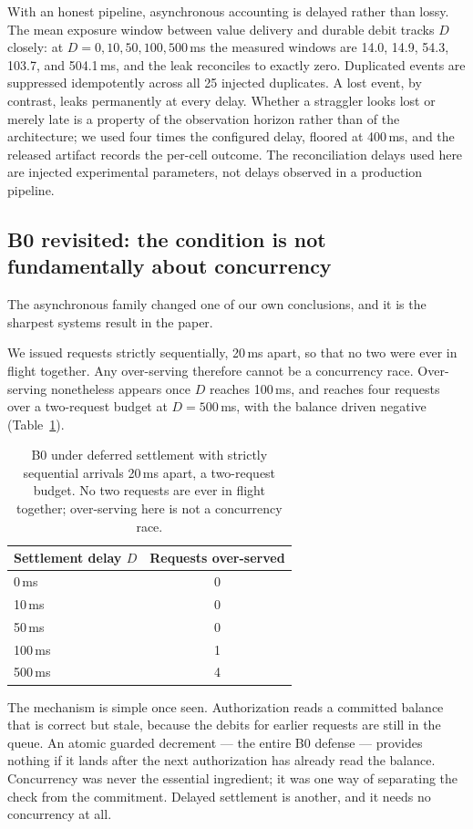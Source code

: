 \documentclass[preprint,3p,authoryear,12pt]{elsarticle}
\begin{document}
With an honest pipeline, asynchronous accounting is delayed rather than lossy. The mean
exposure window between value delivery and durable debit tracks $D$ closely: at $D = 0,
10, 50, 100, 500$\,ms the measured windows are 14.0, 14.9, 54.3, 103.7, and 504.1\,ms, and
the leak reconciles to exactly zero. Duplicated events are suppressed idempotently across
all 25 injected duplicates. A lost event, by contrast, leaks permanently at every delay.
Whether a straggler looks lost or merely late is a property of the observation horizon
rather than of the architecture; we used four times the configured delay, floored at
400\,ms, and the released artifact records the per-cell outcome. The reconciliation
delays used here are injected experimental parameters, not delays observed in a
production pipeline.

\subsection{B0 revisited: the condition is not fundamentally about concurrency}
\label{sec:b0revised}
The asynchronous family changed one of our own conclusions, and it is the sharpest
systems result in the paper.

We issued requests strictly sequentially, 20\,ms apart, so that no two were ever in
flight together. Any over-serving therefore cannot be a concurrency race. Over-serving
nonetheless appears once $D$ reaches 100\,ms, and reaches four requests over a
two-request budget at $D = 500$\,ms, with the balance driven negative
(Table~\ref{tab:asyncb0}).

\begin{table}[t]
\centering
\caption{B0 under deferred settlement with strictly sequential arrivals 20\,ms apart, a
two-request budget. No two requests are ever in flight together; over-serving here is
not a concurrency race.}
\label{tab:asyncb0}
\begin{tabular}{lc}
\toprule
Settlement delay $D$ & Requests over-served \\
\midrule
0\,ms & 0 \\
10\,ms & 0 \\
50\,ms & 0 \\
100\,ms & 1 \\
500\,ms & 4 \\
\bottomrule
\end{tabular}
\end{table}

The mechanism is simple once seen. Authorization reads a committed balance that is
correct but stale, because the debits for earlier requests are still in the queue. An
atomic guarded decrement --- the entire B0 defense --- provides nothing if it lands after
the next authorization has already read the balance. Concurrency was never the essential
ingredient; it was one way of separating the check from the commitment. Delayed
settlement is another, and it needs no concurrency at all.
\end{document}
